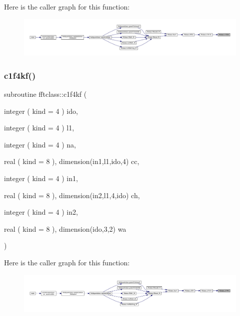 Here is the caller graph for this function\+:\nopagebreak
\begin{figure}[H]
\begin{center}
\leavevmode
\includegraphics[width=350pt]{namespacefftclass_a16b67c4056cd4bef03d70d6289f60954_icgraph}
\end{center}
\end{figure}
\mbox{\label{namespacefftclass_a4121c0b7de23d7df058852fb75a9a31a}} 
\subsubsection{\texorpdfstring{c1f4kf()}{c1f4kf()}}
{\footnotesize\ttfamily subroutine fftclass\+::c1f4kf (\begin{DoxyParamCaption}\item[{integer ( kind = 4 )}]{ido,  }\item[{integer ( kind = 4 )}]{l1,  }\item[{integer ( kind = 4 )}]{na,  }\item[{real ( kind = 8 ), dimension(in1,l1,ido,4)}]{cc,  }\item[{integer ( kind = 4 )}]{in1,  }\item[{real ( kind = 8 ), dimension(in2,l1,4,ido)}]{ch,  }\item[{integer ( kind = 4 )}]{in2,  }\item[{real ( kind = 8 ), dimension(ido,3,2)}]{wa }\end{DoxyParamCaption})}

Here is the caller graph for this function\+:\nopagebreak
\begin{figure}[H]
\begin{center}
\leavevmode
\includegraphics[width=350pt]{namespacefftclass_a4121c0b7de23d7df058852fb75a9a31a_icgraph}
\end{center}
\end{figure}
\mbox{\label{namespacefftclass_aa356856107611ad66966fed70ede74f1}} 
